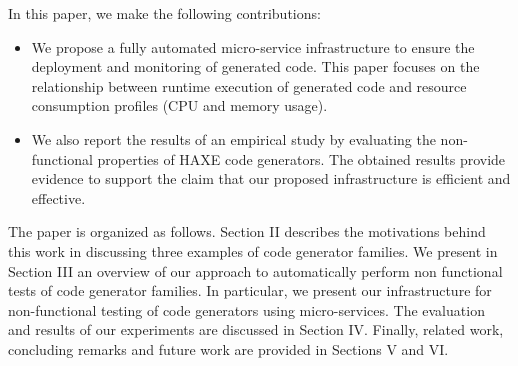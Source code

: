 In this paper, we make the following contributions:
\begin{itemize} 	
	
	\item We propose a fully automated micro-service infrastructure to ensure the deployment and monitoring of generated code. This paper focuses on the relationship between runtime execution of generated code and resource consumption profiles (CPU and memory usage).
	\item We also report the results of an empirical study by evaluating the non-functional properties of HAXE code generators. The obtained results provide evidence to support the claim that our proposed infrastructure is efficient and effective.	
\end{itemize}

The paper is organized as follows.
Section II describes the motivations behind this work in discussing three examples of code generator families. We present in Section III an overview of our approach to automatically perform non functional tests of code generator families. In particular, we present our infrastructure for non-functional testing of code generators using micro-services. 
The evaluation and results of our experiments are discussed in Section IV. 
Finally, related work, concluding remarks and future work are provided in Sections V and VI.














